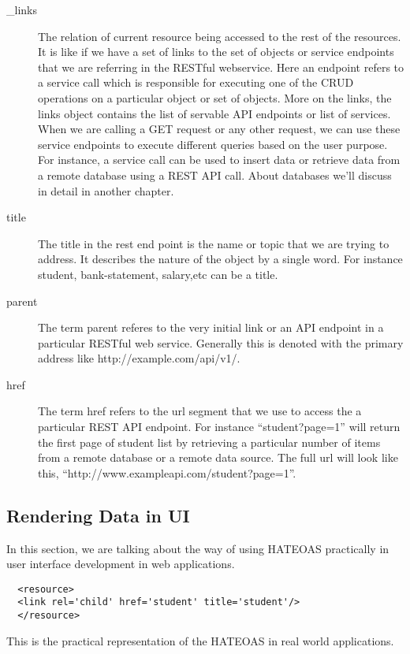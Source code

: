 \begin{description} 

\item [\_links] The relation of current resource being accessed to the
  rest of the resources. It is like if we have a set of links to the
  set of objects or service endpoints that we are referring in the
  RESTful webservice. Here an endpoint refers to a service call which
  is responsible for executing one of the CRUD operations on a
  particular object or set of objects. More on the links, the links
  object contains the list of servable API endpoints or list of
  services.  When we are calling a GET request or any other request,
  we can use these service endpoints to execute different queries
  based on the user purpose.  For instance, a service call can be used
  to insert data or retrieve data from a remote database using a REST
  API call. About databases we'll discuss in detail in another
  chapter.

\item [title] The title in the rest end point is the name or topic
  that we are trying to address. It describes the nature of the object
  by a single word. For instance student, bank-statement, salary,etc
  can be a title.

\item [parent] The term parent referes to the very initial link or an
  API endpoint in a particular RESTful web service. Generally this is
  denoted with the primary address like http://example.com/api/v1/.

\item [href] The term href refers to the url segment that we use to
  access the a particular REST API endpoint. For instance
  ``student?page=1'' will return the first page of student list by
  retrieving a particular number of items from a remote database or a
  remote data source. The full url will look like this,
  ``http://www.exampleapi.com/student?page=1''.

\end{description}  
\subsection{Rendering Data in UI}

In this section, we are talking about the way of using HATEOAS
practically in user interface development in web applications.

\begin{lstlisting}
  <resource>
  <link rel='child' href='student' title='student'/>
  </resource>
\end{lstlisting}

This is the practical representation of the HATEOAS in real world
applications.
